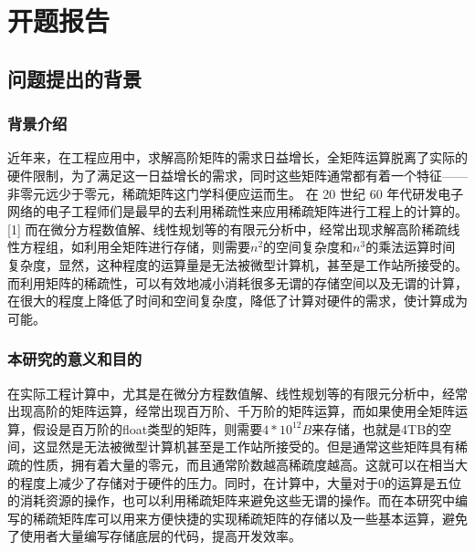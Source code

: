 \documentclass{article}
\begin{document}
  
\renewcommand{\contentsname}{目录}

 \tableofcontents
 \newpage
\section{开题报告}

\subsection{问题提出的背景}
    
     \subsubsection{背景介绍}
     
      近年来，在工程应用中，求解高阶矩阵的需求日益增长，全矩阵运算脱离了实际的硬件限制，为了满足这一日益增长的需求，同时这些矩阵通常都有着一个特征——非零元远少于零元，稀疏矩阵这门学科便应运而生。
在 20 世纪 60 年代研发电子网络的电子工程师们是最早的去利用稀疏性来应用稀疏矩阵进行工程上的计算的。[1]
而在微分方程数值解、线性规划等的有限元分析中，经常出现求解高阶稀疏线性方程组，如利用全矩阵进行存储，则需要$n^2$的空间复杂度和$n^3$的乘法运算时间复杂度，显然，这种程度的运算量是无法被微型计算机，甚至是工作站所接受的。
而利用矩阵的稀疏性，可以有效地减小消耗很多无谓的存储空间以及无谓的计算，在很大的程度上降低了时间和空间复杂度，降低了计算对硬件的需求，使计算成为可能。

 \subsubsection{本研究的意义和目的}

 在实际工程计算中，尤其是在微分方程数值解、线性规划等的有限元分析中，经常出现高阶的矩阵运算，经常出现百万阶、千万阶的矩阵运算，而如果使用全矩阵运算，假设是百万阶的float类型的矩阵，则需要$4*10^{12}B$来存储，也就是4TB的空间，这显然是无法被微型计算机甚至是工作站所接受的。但是通常这些矩阵具有稀疏的性质，拥有着大量的零元，而且通常阶数越高稀疏度越高。这就可以在相当大的程度上减少了存储对于硬件的压力。同时，在计算中，大量对于0的运算是五位的消耗资源的操作，也可以利用稀疏矩阵来避免这些无谓的操作。而在本研究中编写的稀疏矩阵库可以用来方便快捷的实现稀疏矩阵的存储以及一些基本运算，避免了使用者大量编写存储底层的代码，提高开发效率。
 
\end{document}
